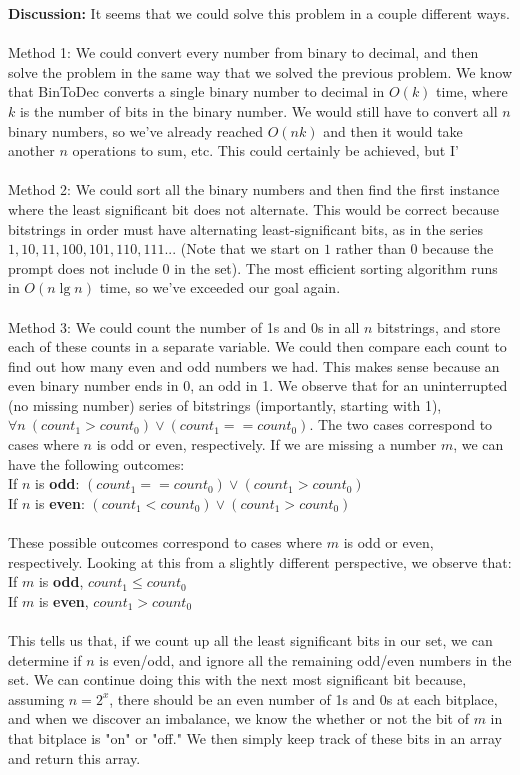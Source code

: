 \documentclass[11pt]{article}
\begin{document}
\noindent\textbf{Discussion:} It seems that we could solve this problem in a couple different ways.\\\\ Method 1: We could convert every number from binary to decimal, and then solve the problem in the same way that we solved the previous problem. We know that BinToDec converts a single binary number to decimal in $O(k)$ time, where $k$ is the number of bits in the binary number. We would still have to convert all $n$ binary numbers, so we've already reached $O(nk)$ and then it would take another $n$ operations to sum, etc. This could certainly be achieved, but I' \\\\Method 2: We could sort all the binary numbers and then find the first instance where the least significant bit does not alternate. This would be correct because bitstrings in order must have alternating least-significant bits, as in the series $1, 10, 11, 100, 101, 110, 111...$ (Note that we start on $1$ rather than $0$ because the prompt does not include 0 in the set). The most efficient sorting algorithm runs in $O(n \lg n)$ time, so we've exceeded our goal again.\\\\Method 3: We could count the number of 1s and 0s in all $n$ bitstrings, and store each of these counts in a separate variable. We could then compare each count to find out how many even and odd numbers we had. This makes sense because an even binary number ends in 0, an odd in 1. We observe that for an uninterrupted (no missing number) series of bitstrings (importantly, starting with 1),  $\forall n \>   (count_1 > count_0) \lor (count_1 == count_0)$. The two cases correspond to cases where $n$ is odd or even, respectively. If we are missing a number $m$, we can have the following outcomes:\\

\noindent If $n$ is \textbf{odd}: $(count_1 == count_0) \lor (count_1 > count_0)$\\
\noindent If $n$ is \textbf{even}: $(count_1 < count_0) \lor (count_1 > count_0)$\\\\
These possible outcomes correspond to cases where $m$ is odd or even, respectively. Looking at this from a slightly different perspective, we observe that: \\

\noindent If $m$ is \textbf{odd}, $count_1 \leq count_0$\\
If $m$ is \textbf{even}, $count_1 > count_0$\\\\
This tells us that, if we count up all the least significant bits in our set, we can determine if $n$ is even/odd, and ignore all the remaining odd/even numbers in the set. We can continue doing this with the next most significant bit because, assuming $n = 2^x$, there should be an even number of 1s and 0s at each bitplace, and when we discover an imbalance, we know the whether or not the bit of $m$ in that bitplace is "on" or "off." We then simply keep track of these bits in an array and return this array. 
\end{document}
